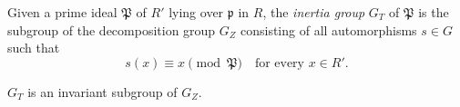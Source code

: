 Given a prime ideal $\mathfrak{P}$ of $R'$ lying over $\mathfrak{p}$ in $R$, the \textit{inertia group} $G_T$ of $\mathfrak{P}$ is the subgroup of the decomposition group $G_Z$ consisting of all automorphisms $s \in G$ such that
$$s(x) \equiv x \pmod{\mathfrak{P}} \quad \text{for every } x \in R'.$$

$G_T$ is an invariant subgroup of $G_Z$.
